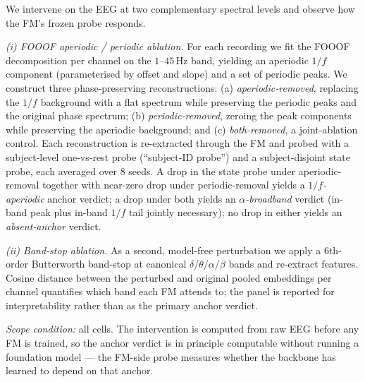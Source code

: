 We intervene on the EEG at two complementary spectral levels and
observe how the FM's frozen probe responds.

\emph{(i) FOOOF aperiodic / periodic ablation.} For each recording we
fit the FOOOF decomposition \citep{donoghue2020fooof} per channel on
the $1$--$45$\,Hz band, yielding an aperiodic $1/f$ component
(parameterised by offset and slope) and a set of periodic peaks. We
construct three phase-preserving reconstructions: (a)
\emph{aperiodic-removed}, replacing the $1/f$ background with a flat
spectrum while preserving the periodic peaks and the original phase
spectrum; (b) \emph{periodic-removed}, zeroing the peak components
while preserving the aperiodic background; and (c) \emph{both-removed},
a joint-ablation control. Each reconstruction is re-extracted through
the FM and probed with a subject-level one-vs-rest probe
(``subject-ID probe'') and a subject-disjoint state probe, each
averaged over 8 seeds. A drop in the state probe under
aperiodic-removal together with near-zero drop under periodic-removal
yields a \emph{$1/f$-aperiodic} anchor verdict; a drop under both
yields an \emph{$\alpha$-broadband} verdict (in-band peak plus
in-band $1/f$ tail jointly necessary); no drop in either yields an
\emph{absent-anchor} verdict.

\emph{(ii) Band-stop ablation.} As a second, model-free perturbation we
apply a $6$th-order Butterworth band-stop at canonical
$\delta$/$\theta$/$\alpha$/$\beta$ bands and re-extract features.
Cosine distance between the perturbed and original pooled embeddings
per channel quantifies which band each FM attends to; the panel is
reported for interpretability rather than as the primary anchor
verdict.

\emph{Scope condition:} all cells. The intervention is computed from
raw EEG before any FM is trained, so the anchor verdict is in
principle computable without running a foundation model --- the
FM-side probe measures whether the backbone has learned to depend on
that anchor.
